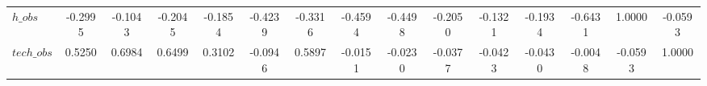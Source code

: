 \begin{center}
\begin{longtable}{lcccccccccccccc}
$h\_obs         $	 & 	          -0.2995	 & 	          -0.1043	 & 	          -0.2045	 & 	          -0.1854	 & 	          -0.4239	 & 	          -0.3316	 & 	          -0.4594	 & 	          -0.4498	 & 	          -0.2050	 & 	          -0.1321	 & 	          -0.1934	 & 	          -0.6431	 & 	           1.0000	 & 	          -0.0593 \\ 
$tech\_obs      $	 & 	           0.5250	 & 	           0.6984	 & 	           0.6499	 & 	           0.3102	 & 	          -0.0946	 & 	           0.5897	 & 	          -0.0151	 & 	          -0.0230	 & 	          -0.0377	 & 	          -0.0423	 & 	          -0.0430	 & 	          -0.0048	 & 	          -0.0593	 & 	           1.0000 \\ 
\end{longtable}
 \end{center}
